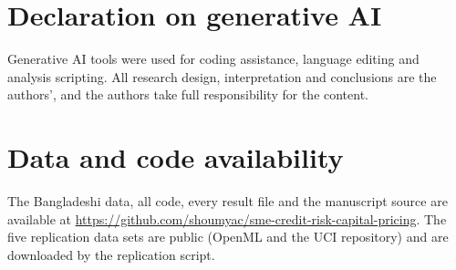 \documentclass[11pt,a4paper]{article}
\begin{document}
\section*{Declaration on generative AI}
Generative AI tools were used for coding assistance, language editing and analysis scripting. All research design, interpretation and conclusions are the authors', and the authors take full responsibility for the content.

\section*{Data and code availability}
The Bangladeshi data, all code, every result file and the manuscript source are available at \url{https://github.com/shoumyac/sme-credit-risk-capital-pricing}. The five replication data sets are public (OpenML and the UCI repository) and are downloaded by the replication script.


\end{document}
